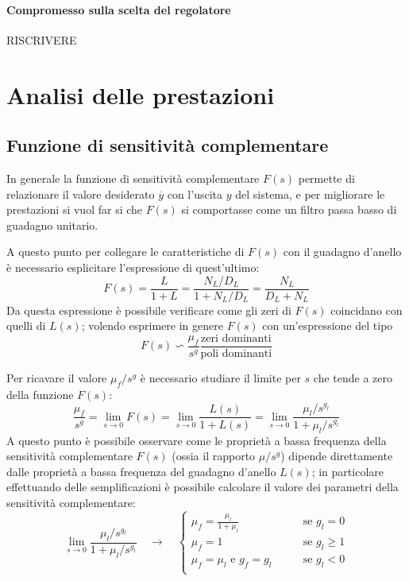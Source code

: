 	\paragraph{Compromesso sulla scelta del regolatore} RISCRIVERE
	
\section{Analisi delle prestazioni}

	\subsection{Funzione di sensitività complementare}
		In generale la funzione di sensitività complementare $F(s)$ permette di relazionare il valore desiderato $\overline y$ con l'uscita $y$ del sistema, e per migliorare le prestazioni si vuol far si che $F(s)$ si comportasse come un filtro passa basso di guadagno unitario.
		
		A questo punto per collegare le caratteristiche di $F(s)$ con il guadagno d'anello è necessario esplicitare l'espressione di quest'ultimo:
		\[ F(s) = \frac L {1+L} = \frac{N_L/D_L}{1+ N_L/D_L} = \frac{N_L}{D_L + N_L} \]
		Da questa espressione è possibile verificare come gli zeri di $F(s)$ coincidano con quelli di $L(s)$; volendo esprimere in genere $F(s)$ con un'espressione del tipo
		\[ F(s) \backsim \frac {\mu_f} {s^g} \frac{\textrm{zeri dominanti}}{\textrm{poli dominanti}}\]
		
		Per ricavare il valore $\mu_f / s^g$ è necessario studiare il limite per $s$ che tende a zero della funzione $F(s)$:
		\[ \frac{\mu_f}{s^g} =  \lim_{s\rightarrow 0} F(s) = \lim_{s\rightarrow 0} \frac{L(s)}{1+L(s)} = \lim_{s\rightarrow 0} \frac{\mu_l / s^{g_l}}{ 1 + \mu_l / s^{g_l}} \]	
		A questo punto è possibile osservare come le proprietà a bassa frequenza della sensitività complementare $F(s)$ (ossia il rapporto $\mu/s^g$) dipende direttamente dalle proprietà a bassa frequenza del guadagno d'anello $L(s)$; in particolare effettuando delle semplificazioni è possibile calcolare il valore dei parametri della sensitività complementare:
		\[ \lim_{s\rightarrow 0} \frac{\mu_l / s^{g_l}}{ 1 + \mu_l / s^{g_l}} \quad \rightarrow \quad \begin{cases}
			\mu_f = \frac{\mu_l}{1 + \mu_l} \qquad & \textrm{se } g_l = 0 \\
			\mu_f = 1 \qquad & \textrm{se } g_l \geq 1 \\ 
			\mu_f = \mu_l \textrm{ e } g_f = g_l  \qquad & \textrm{se } g_l < 0 \\ 
		\end{cases}  \]
	

